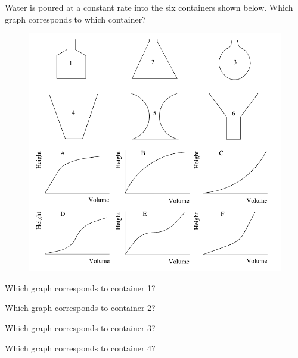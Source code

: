 \documentclass{ximera}
\author{Vic Ferdinand, Betsy McNeal, Jenny Sheldon}
\begin{document}
\begin{exercise}
Water is poured at a constant rate into the six containers shown
below. Which graph corresponds to which container?

\begin{figure}[h]
\begin{center}
\includegraphics[width=\textwidth]{GraphicDetails3.png}
\end{center}
\end{figure}

Which graph corresponds to container 1?
\begin{multipleChoice}
\end{multipleChoice}


Which graph corresponds to container 2?
\begin{multipleChoice}
\end{multipleChoice}


Which graph corresponds to container 3?
\begin{multipleChoice}
\end{multipleChoice}


Which graph corresponds to container 4?
\begin{multipleChoice}
\end{multipleChoice}



\end{exercise}
\end{document}

